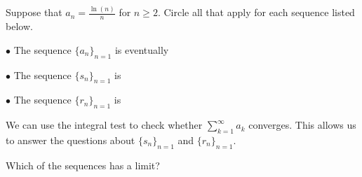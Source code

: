 \documentclass{ximera}
\author{Jim Talamo}
\begin{document}
\begin{exercise}

Suppose that $a_n = \frac{\ln(n)}{n}$ for $n \geq 2$. Circle all that apply for each sequence listed below.

$\bullet$ The sequence $\{a_n\}_{n=1}$ is eventually
\begin{selectAll}
\end{selectAll}

$\bullet$ The sequence $\{s_n\}_{n=1}$ is
\begin{selectAll}
\end{selectAll}

$\bullet$ The sequence $\{r_n\}_{n=1}$ is
\begin{selectAll}
\end{selectAll}

\begin{hint}
We can use the integral test to check whether $\sum_{k=1}^{\infty} a_k$ converges.  This allows us to answer the questions about $\{s_n\}_{n=1}$ and $\{r_n\}_{n=1}$.
\end{hint}

\begin{exercise}
Which of the sequences has a limit?
\begin{selectAll}
\end{selectAll}
\end{exercise}


\end{exercise}
\end{document}
